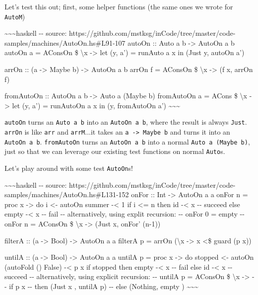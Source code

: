 \documentclass[]{article}
\begin{document}
Let's test this out; first, some helper functions (the same ones we wrote for
\texttt{AutoM})

\textasciitilde{}\textasciitilde{}\textasciitilde{}haskell -\/- source:
https://github.com/mstksg/inCode/tree/master/code-samples/machines/AutoOn.hs\#L91-107
autoOn :: Auto a b -\textgreater{} AutoOn a b autoOn a = AConsOn \$
\textbackslash{}x -\textgreater{} let (y, a') = runAuto a x in (Just y, autoOn
a')

arrOn :: (a -\textgreater{} Maybe b) -\textgreater{} AutoOn a b arrOn f =
AConsOn \$ \textbackslash{}x -\textgreater{} (f x, arrOn f)

fromAutoOn :: AutoOn a b -\textgreater{} Auto a (Maybe b) fromAutoOn a = ACons
\$ \textbackslash{}x -\textgreater{} let (y, a') = runAutoOn a x in (y,
fromAutoOn a') \textasciitilde{}\textasciitilde{}\textasciitilde{}

\texttt{autoOn} turns an \texttt{Auto\ a\ b} into an \texttt{AutoOn\ a\ b},
where the result is always \texttt{Just}. \texttt{arrOn} is like \texttt{arr}
and \texttt{arrM}...it takes an \texttt{a\ -\textgreater{}\ Maybe\ b} and turns
it into an \texttt{AutoOn\ a\ b}. \texttt{fromAutoOn} turns an
\texttt{AutoOn\ a\ b} into a normal \texttt{Auto\ a\ (Maybe\ b)}, just so that
we can leverage our existing test functions on normal \texttt{Auto}s.

Let's play around with some test \texttt{AutoOn}s!

\textasciitilde{}\textasciitilde{}\textasciitilde{}haskell -\/- source:
https://github.com/mstksg/inCode/tree/master/code-samples/machines/AutoOn.hs\#L131-152
onFor :: Int -\textgreater{} AutoOn a a onFor n = proc x -\textgreater{} do i
\textless{}- autoOn summer -\textless{} 1 if i \textless{}= n then id
-\textless{} x -\/- succeed else empty -\textless{} x -\/- fail -\/-
alternatively, using explit recursion: -\/- onFor 0 = empty -\/- onFor n =
AConsOn \$ \textbackslash{}x -\textgreater{} (Just x, onFor' (n-1))

filterA :: (a -\textgreater{} Bool) -\textgreater{} AutoOn a a filterA p = arrOn
(\textbackslash{}x -\textgreater{} x \textless{}\$ guard (p x))

untilA :: (a -\textgreater{} Bool) -\textgreater{} AutoOn a a untilA p = proc x
-\textgreater{} do stopped \textless{}- autoOn (autoFold (\textbar{}\textbar{})
False) -\textless{} p x if stopped then empty -\textless{} x -\/- fail else id
-\textless{} x -\/- succeed -\/- alternatively, using explicit recursion: -\/-
untilA p = AConsOn \$ \textbackslash{}x -\textgreater{} -\/- if p x -\/- then
(Just x , untilA p) -\/- else (Nothing, empty )
\textasciitilde{}\textasciitilde{}\textasciitilde{}
\end{document}
